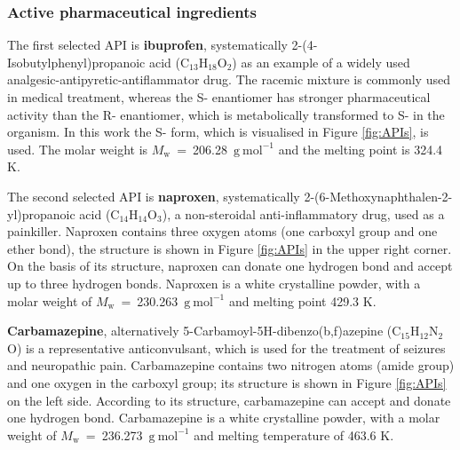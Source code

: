 \subsubsection{Active pharmaceutical ingredients}

The first selected API is \textbf{ibuprofen}, systematically 2-(4-Isobutylphenyl)propanoic acid (C$_{13}$H$_{18}$O$_{2}$) as an example of a widely used analgesic-antipyretic-antiflammator drug. The racemic mixture is commonly used in medical treatment, whereas the S- enantiomer has stronger pharmaceutical activity than the R- enantiomer, which is metabolically transformed to S- in the organism. \cite{rainsford_ibuprofen_2009} In this work the S- form, which is visualised in Figure \ref{fig:APIs}, is used. The molar weight is $M_\mathrm{w}$~=~206.28~$\mathrm{g\ mol^{-1}}$ and the melting point is 324.4 K. \cite{stejfa_heat_2021} 

The second selected API is \textbf{naproxen}, systematically 2-(6-Methoxynaphthalen-2-yl)propanoic acid (C$_{14}$H$_{14}$O$_{3}$), a non-steroidal anti-inflammatory drug, used as a painkiller. Naproxen contains three oxygen atoms (one carboxyl group and one ether bond), the structure is shown in Figure \ref{fig:APIs} in the upper right corner. On the basis of its structure, naproxen can donate one hydrogen bond and accept up to three hydrogen bonds. Naproxen is a white crystalline powder, with a molar weight of $M_\mathrm{w}$~=~230.263~$\mathrm{g\ mol^{-1}}$ and melting point 429.3 K. \cite{stejfa_heat_2021}

\textbf{Carbamazepine}, alternatively 5-Carbamoyl-5H-dibenzo(b,f)azepine (C$_{15}$H$_{12}$N$_{2}$O) is a representative anticonvulsant, which is used for the treatment of seizures and neuropathic pain. Carbamazepine contains two nitrogen atoms (amide group) and one oxygen in the carboxyl group; its structure is shown in Figure \ref{fig:APIs} on the left side. According to its structure, carbamazepine can accept and donate one hydrogen bond. Carbamazepine is a white crystalline powder, with a molar weight of $M_\mathrm{w}$~=~236.273~$\mathrm{g\ mol^{-1}}$ and melting temperature of 463.6 K. \cite{stejfa_heat_2021}

